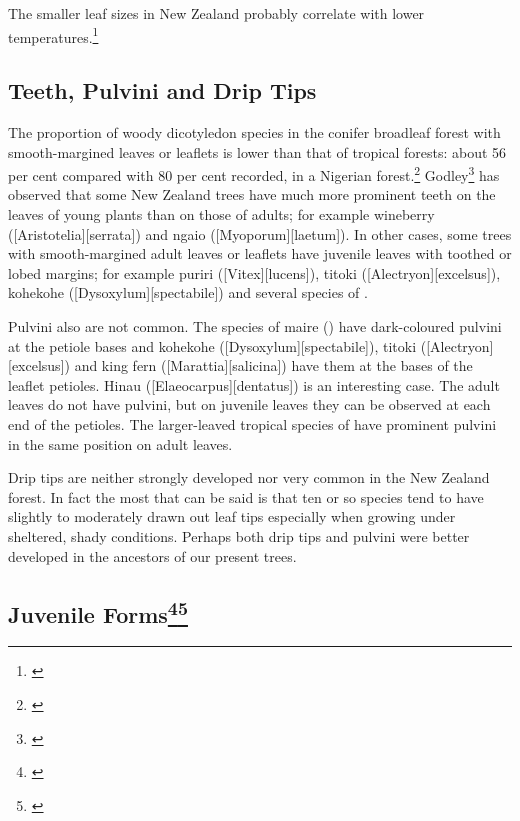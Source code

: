 The smaller leaf sizes in New Zealand probably correlate with lower temperatures.\footnote{\cite{dawson1986floristic}}

\subsection{Teeth, Pulvini and Drip Tips}

The proportion of woody dicotyledon species in the conifer broadleaf forest with smooth-margined leaves or leaflets is lower than that of tropical forests: about 56 per cent compared with 80 per cent recorded, in a Nigerian forest.\footnote{\cite{richards1952tropical}}
Godley\footnote{\cite{godley1985paths}} has observed that some New Zealand trees have much more prominent teeth on the leaves of young plants than on those of adults; for example wineberry ([Aristotelia][serrata]) and ngaio ([Myoporum][laetum]).
In other cases, some trees with smooth-margined adult leaves or leaflets have juvenile leaves with toothed or lobed margins; for example puriri ([Vitex][lucens]), titoki ([Alectryon][excelsus]), kohekohe ([Dysoxylum][spectabile]) and several species of .

Pulvini also are not common.
The species of maire () have dark-coloured pulvini at the petiole bases and kohekohe ([Dysoxylum][spectabile]), titoki ([Alectryon][excelsus]) and king fern ([Marattia][salicina]) have them at the bases of the leaflet petioles.
Hinau ([Elaeocarpus][dentatus]) is an interesting case.
The adult leaves do not have pulvini, but on juvenile leaves they can be observed at each end of the petioles.
The larger-leaved tropical species of  have prominent pulvini in the same position on adult leaves.

Drip tips are neither strongly developed nor very common in the New Zealand forest.
In fact the most that can be said is that ten or so species tend to have slightly to moderately drawn out leaf tips especially when growing under sheltered, shady conditions.
Perhaps both drip tips and pulvini were better developed in the ancestors of our present trees.

\subsection[Juvenile Forms]{Juvenile Forms\thinspace\footnote{\cite{godley1985paths}}\footnote{\cite{philipson1964habit}}}

